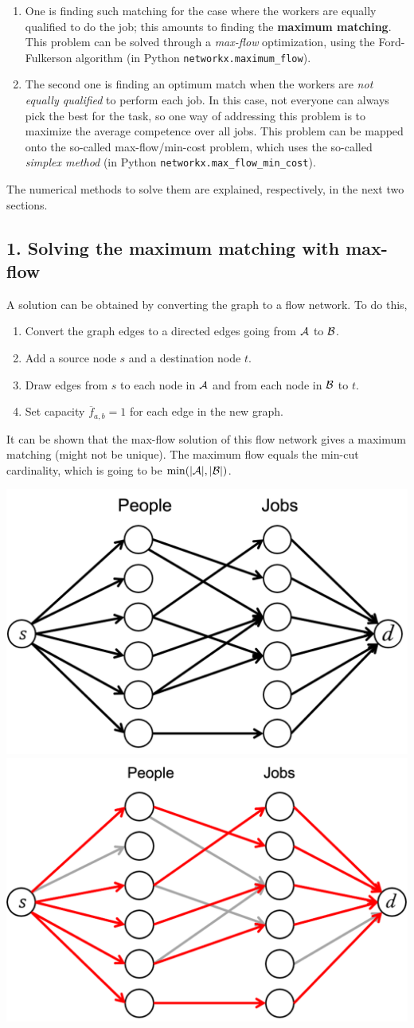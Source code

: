 \documentclass[11pt]{exam}
\begin{document}
\begin{enumerate}
\item One is finding such matching for the case where the workers are equally qualified to do the job; this amounts to finding the {\bf maximum matching}. This problem can be solved through a {\it max-flow} optimization, using the Ford-Fulkerson algorithm (in Python \texttt{networkx.maximum\_flow}). 
 \item The second one is finding an optimum match when the workers are {\it not equally qualified} to perform each job. In this case, not everyone can always pick the best for the task, so one way of addressing this problem is to maximize the average competence over all jobs. This problem can be mapped onto the so-called max-flow/min-cost problem, which uses the so-called {\it simplex method} (in Python \texttt{networkx.max\_flow\_min\_cost}). 
\end{enumerate}
The numerical methods to solve them are explained, respectively, in the next two sections. 
\subsection*{1. Solving the maximum matching with max-flow}
A solution can be obtained by converting the graph to a flow network. To do this, 
\begin{enumerate}
  \item Convert the graph edges to a directed edges going from $\cal A$ to $\cal B$. 
  \item Add a source node $s$ and a destination node $t$. 
  \item Draw edges from  $s$ to each node in $\cal A$ and from each node in $\cal B$ to $t$. 
  \item Set capacity $\overline{f}_{a,b}=1$ for each edge in the new graph.
\end{enumerate}
It can be shown that the max-flow solution of this flow network gives a maximum matching (might not be unique). The maximum flow equals the min-cut cardinality, which is going to be $\min(|{\cal A}|,|{\cal B}|)$.
\begin{center}
\includegraphics[width=0.4\linewidth]{bipartite-match1.png}
\includegraphics[width=0.4\linewidth]{bipartite-match2.png}
\end{center}
%
\end{document}

